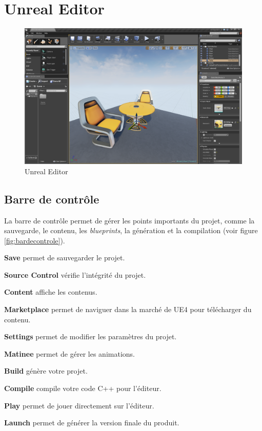 \documentclass[11pt, a4paper, oneside]{article}
\begin{document}
\section{Unreal Editor}
\begin{center}
\begin{figure}[htp]
\includegraphics[scale=.39]{ue4editor}
\caption{Unreal Editor}
\end{figure}
\end{center}

\subsection{Barre de contrôle}
La barre de contrôle permet de gérer les points importants du projet, comme la sauvegarde, le contenu, les \emph{blueprints}, la génération et la compilation (voir figure \ref{fig:bardecontrole}).

\begin{description}
	\item{\textbf{Save}} permet de sauvegarder le projet.
	\item{\textbf{Source Control}} vérifie l'intégrité du projet.
	\item{\textbf{Content}} affiche les contenus.
	\item{\textbf{Marketplace}} permet de naviguer dans la marché de UE4 pour télécharger du contenu.
	\item{\textbf{Settings}} permet de modifier les paramètres du projet.
	\item{\textbf{Matinee}} permet de gérer les animations.
	\item{\textbf{Build}} génère votre projet.
	\item{\textbf{Compile}} compile votre code C++ pour l'éditeur.
	\item{\textbf{Play}} permet de jouer directement sur l'éditeur.
	\item{\textbf{Launch}} permet de générer la version finale du produit.
\end{description}
\end{document}
